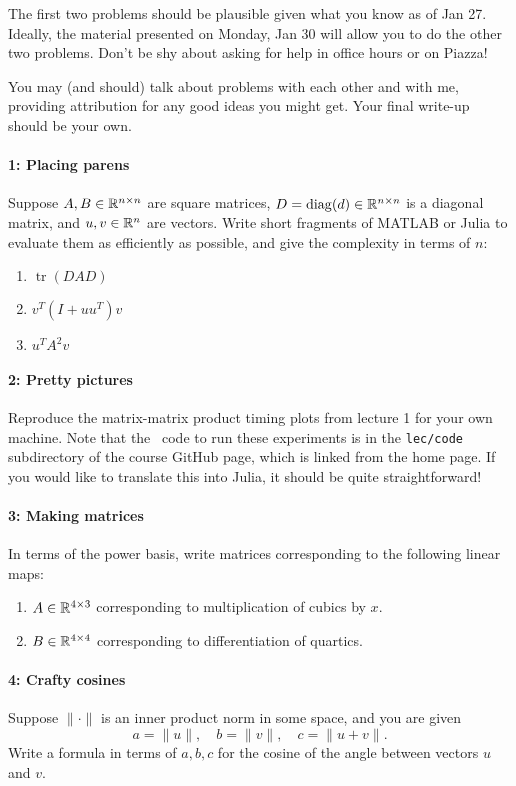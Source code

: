 \documentclass[12pt, leqno]{article} %
\begin{document}

The first two problems should be plausible given what you know as of
Jan 27.  Ideally, the material presented on Monday, Jan 30 will allow
you to do the other two problems.  Don't be shy about asking for help
in office hours or on Piazza!

You may (and should) talk about problems with each other and with me,
providing attribution for any good ideas you might get.  Your final
write-up should be your own.

\paragraph*{1: Placing parens}
Suppose $A, B \in \mathbb{R}^{n \times n}$ are square matrices,
$D = \operatorname{diag}(d) \in \mathbb{R}^{n \times n}$ is a diagonal matrix,
and $u, v \in \mathbb{R}^n$ are vectors.  Write short
fragments of MATLAB or Julia to evaluate them as efficiently
as possible, and give the complexity in terms of $n$:
\begin{enumerate}
\item $\operatorname{tr}(DAD)$
\item $v^T (I+uu^T) v$
\item $u^T A^2 v$
\end{enumerate}

\paragraph*{2: Pretty pictures}
Reproduce the matrix-matrix product timing plots from lecture 1 for your
own machine. Note that the \matlab\ code to run these experiments is in
the {\tt lec/code} subdirectory of the course GitHub page, which is
linked from the home page.  If you would like to translate this into
Julia, it should be quite straightforward!

\paragraph*{3: Making matrices}
In terms of the power basis, write matrices corresponding to the
following linear maps:
\begin{enumerate}
\item $A \in \mathbb{R}^{4 \times 3}$ corresponding to multiplication of cubics
by $x$.
\item $B \in \mathbb{R}^{4 \times 4}$ corresponding to differentiation of quartics.
\end{enumerate}

\paragraph*{4: Crafty cosines}
Suppose $\|\cdot\|$ is an inner product norm in some space, and you
are given
\[
  a = \|u\|, \quad
  b = \|v\|, \quad
  c = \|u+v\|.
\]
Write a formula in terms of $a, b, c$ for the cosine of the angle
between vectors $u$ and $v$.
\end{document}
